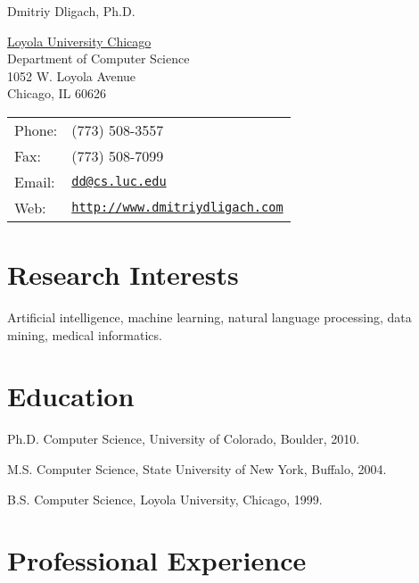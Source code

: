 \documentclass[letterpaper]{article}
\def\name{Dmitriy Dligach, Ph.D.}
\renewenvironment{itemize}{
  \begin{list}{}{
    \setlength{\leftmargin}{1.5em}
  }
}{
  \end{list}
}
\begin{document}
{\huge \name}

\vspace{0.25in}

\begin{minipage}{0.45\linewidth}
\href{http://www.luc.edu}{Loyola University Chicago} \\
Department of Computer Science \\
1052 W. Loyola Avenue \\
Chicago, IL 60626
\end{minipage}
\begin{minipage}{0.45\linewidth}
\begin{tabular}{ll}
Phone: & (773) 508-3557\\
Fax: &  (773) 508-7099 \\
Email: & \href{mailto:dd at cs.luc.edu}{\tt dd@cs.luc.edu} \\
Web: & \href{http://www.dmitriydligach.com}{\tt http://www.dmitriydligach.com} \\
\end{tabular}
\end{minipage}

\section*{Research Interests}

Artificial intelligence, machine learning, natural language processing, data mining, medical informatics.

\section*{Education}

\begin{itemize}
\item Ph.D. Computer Science, University of Colorado, Boulder, 2010.
\item M.S. Computer Science, State University of New York, Buffalo, 2004.
\item B.S. Computer Science, Loyola University, Chicago, 1999.
\end{itemize}

\section*{Professional Experience}
\end{document}
